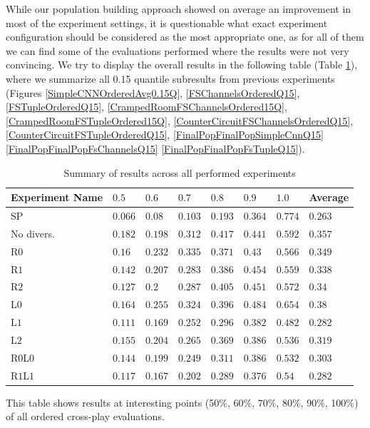 While our population building approach showed on average an improvement in most of the experiment settings, it is questionable what exact experiment configuration should be considered as the most appropriate one, as for all of them we can find some of the evaluations performed where the results were not very convincing.
We try to display the overall results in the following table (Table \ref{tab:exp_settings_results}), where we summarize all 0.15 quantile subresults from previous experiments (Figures \ref{SimpleCNNOrderedAvg0.15Q}, \ref{FSChannelsOrderedQ15}, \ref{FSTupleOrderedQ15}, \ref{CrampedRoomFSChannelsOrdered15Q}, \ref{CrampedRoomFSTupleOrdered15Q}, \ref{CounterCircuitFSChannelsOrderedQ15}, \ref{CounterCircuitFSTupleOrderedQ15}, \ref{FinalPopFinalPopSimpleCnnQ15} \ref{FinalPopFinalPopFsChannelsQ15} \ref{FinalPopFinalPopFsTupleQ15}).
\begin{table}[tbp]
    \small
    \centering
    \begin{tabular}{l|llllll|l}
      \toprule
      Experiment Name        & $0.5$     & $0.6$  & $0.7$  & $0.8$  & $0.9$  & $1.0$ & Average          \\ \midrule
      SP           & $0.066$ & $0.08$ & $0.103$ & $0.193$ & $0.364$ & $0.774$ & $0.263$   \\\midrule      

      No divers.   & $0.182$ & $0.198$ & $0.312$ & $0.417$ & $0.441$ & $0.592$ & $0.357$ \\\midrule
      R$0$         & $0.16$ & $0.232$ & $0.335$ & $0.371$ & $0.43$ & $0.566$ & $0.349$ \\
      R$1$         & $0.142$ & $0.207$ & $0.283$ & $0.386$ & $0.454$ & $0.559$ & $0.338$ \\
      R$2$         & $0.127$ & $0.2$ & $0.287$ & $0.405$ & $0.451$ & $0.572$ & $0.34$ \\\midrule
      L$0$         & $0.164$ & $0.255$ & $0.324$ & $0.396$ & $0.484$ & $0.654$ & $0.38$  \\
      L$1$         & $0.111$ & $0.169$ & $0.252$ & $0.296$ & $0.382$ & $0.482$ & $0.282$  \\
      L$2$         & $0.155$ & $0.204$ & $0.265$ & $0.369$ & $0.386$ & $0.536$ & $0.319$  \\\midrule
      R$0$L$0$     & $0.144$ & $0.199$ & $0.249$ & $0.311$ & $0.386$ & $0.532$ & $0.303$  \\
      R$1$L$1$     & $0.117$ & $0.167$ & $0.202$ & $0.289$ & $0.376$ & $0.54$ & $0.282$  \\
      
      
     \bottomrule
    \end{tabular}
    \caption{Summary of results across all performed experiments}
    \label{tab:exp_settings_results}
    \small
    This table shows results at interesting points (50\%, 60\%, 70\%, 80\%, 90\%, 100\%) of all ordered cross-play evaluations.    
\end{table}
